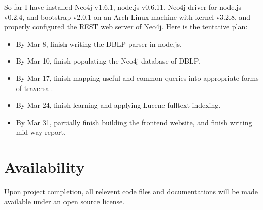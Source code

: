 \documentclass[10pt, conference, compsocconf]{../IEEEtran}
\begin{document}
So far I have installed Neo4j v1.6.1, node.js v0.6.11, Neo4j driver for node.js v0.2.4, and bootstrap v2.0.1 on an Arch Linux machine with kernel v3.2.8, and properly configured the REST web server of Neo4j. Here is the tentative plan:

\begin{itemize}
\item By Mar 8, finish writing the DBLP parser in node.js.
\item By Mar 10, finish populating the Neo4j database of DBLP.
\item By Mar 17, finish mapping useful and common queries into appropriate forms of traversal.
\item By Mar 24, finish learning and applying Lucene fulltext indexing.
\item By Mar 31, partially finish building the frontend website, and finish writing mid-way report.
\end{itemize}

\section{Availability}

Upon project completion, all relevent code files and documentations will be made available under an open source license.






\end{document}
